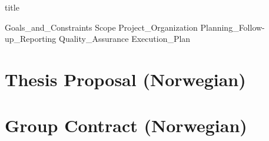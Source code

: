 \documentclass{article}
\begin{document}
{title}

\frontmatter

\tableofcontents
\hypersetup{    %
    colorlinks,
    citecolor = blue,
    filecolor = magenta,
    linkcolor = magenta,
    urlcolor = magenta
}

\listoffigures
\listoftables

\mainmatter

{Goals_and_Constraints}
{Scope}
{Project_Organization}
{Planning_Follow-up_Reporting}
{Quality_Assurance}
{Execution_Plan}

\newpage
\printbibliography[heading = bibintoc, title = Bibliography]

\addappendix

\section{Thesis Proposal (Norwegian)}
\label{appendix:thesis_proposal}

\begin{minipage}{\textwidth}
    \centering
    
\end{minipage}



\section{Group Contract (Norwegian)}
\label{appendix:group_contract}

\begin{minipage}{\textwidth}
    \centering
    
\end{minipage}

\end{document}
